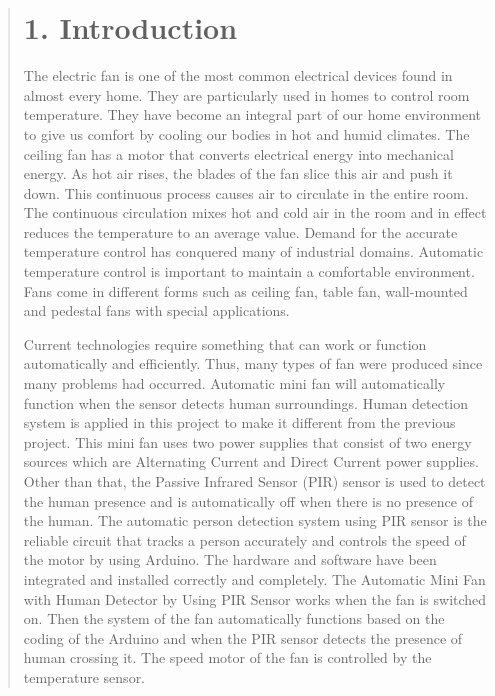 \documentclass[12pt]{report}
\begin{document}
	
	\begin{quote}
		\section{1. Introduction}
		The electric fan is one of the most common electrical devices found in  almost  every home.  They  are particularly  used in  homes  to control room temperature. They  have  become  an integral part of our home environment to give us comfort by cooling our bodies in hot and humid climates. The ceiling fan has a motor that converts electrical energy into mechanical energy. As hot air rises, the  blades of the  fan slice this air and  push it down. This continuous process causes air to circulate in the entire room. The continuous circulation mixes hot and cold air in the room and in effect reduces the temperature to an average value. Demand for the accurate temperature control has conquered many of industrial domains. Automatic temperature control is important to maintain a comfortable environment. Fans come in different forms such as ceiling fan, table fan, wall-mounted and pedestal fans with special applications.
		
		Current technologies require something that can work or function automatically and efficiently. Thus, many types of fan were produced since many problems had occurred. Automatic mini fan will 
		automatically function when the sensor detects human surroundings. Human detection system is 
		applied in this project to make it different from the previous project. 
		This mini fan uses two power supplies that consist of two energy sources which are Alternating 
		Current and Direct Current power supplies. Other than that, the Passive Infrared Sensor 
		(PIR) sensor is used to detect the human presence and is automatically off when there is no presence 
		of the human. The automatic person detection system using PIR sensor is the reliable circuit that tracks a person accurately and controls the speed of the motor by using Arduino. The hardware and 
		software have been integrated and installed correctly and completely. The Automatic Mini Fan with 
		Human Detector by Using PIR Sensor works when the fan is switched on. Then the system of the fan 
		automatically functions based on the coding of the Arduino and when the PIR sensor detects the 
		presence of human crossing it. The speed motor of the fan is controlled by the temperature sensor.
		
	\end{quote}
	\clearpage
	
\end{document}
